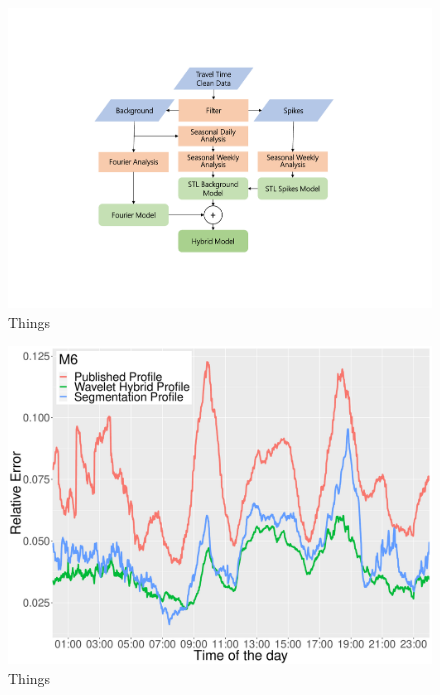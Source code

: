 \documentclass[letterpaper, 10 pt, conference]{ieeeconf}  %
\begin{document}
\begin{figure}[htbp]
	\centerline{\includegraphics[width=\linewidth]{./images/flow_temp.pdf}}
	\caption{Things}
	\label{fig:dataflow}
\end{figure}

\begin{figure}[htbp]
	\centerline{\includegraphics[width=\linewidth]{./images/m6_daytime.pdf}}
	\caption{Things}
	\label{fig:m6dt}
\end{figure}
\end{document}
